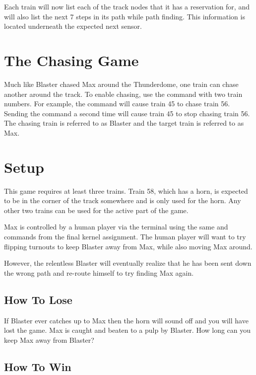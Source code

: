 \documentclass[pdftex,10pt,a4paper]{article}
\begin{document}
Each train will now list each of the track nodes that it has a
reservation for, and will also list the next 7 steps in its path while
path finding. This information is located underneath the expected next
sensor.

\section*{The Chasing Game}

Much like Blaster chased Max around the Thunderdome, one train can
chase another around the track. To enable chasing, use the
 command with two train numbers. For
example, the command  will cause train 45 to chase train
56. Sending the command a second time will cause train 45 to stop
chasing train 56. The chasing train is referred to as Blaster and the
target train is referred to as Max.

\section*{Setup}

This game requires at least three trains. Train 58, which has a horn,
is expected to be in the corner of the track somewhere and is only
used for the horn. Any other two trains can be used for the active
part of the game.

Max is controlled by a human player via the terminal using the same
 and  commands from
the final kernel assignment. The human player will want to try
flipping turnouts to keep Blaster away from Max, while also moving Max
around.

However, the relentless Blaster will eventually realize that he has
been sent down the wrong path and re-route himself to try finding Max
again.

\subsection*{How To Lose}

If Blaster ever catches up to Max then the horn will sound off and you
will have lost the game. Max is caught and beaten to a pulp by
Blaster. How long can you keep Max away from Blaster?

\subsection*{How To Win}
\end{document}
